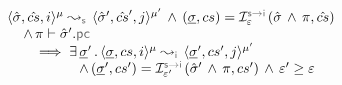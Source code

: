 \begin{lemma}\label{soundiness:control:flow:cmds}
$$
\begin{array}{l} 
\abssemrule{\sstate, \scs, i}{\sstate', \scs', j}{\mode}{\mode'}{\symbolic} 
     \, \wedge \, (\istate, \cs) = \interpret{\symbinst}{\senv}(\sstate \, \wedge \, \pc, \scs) \\ \quad
     \, \wedge \, \pc \vdash \sstate'.\pcsel  \\ \quad \quad
     \implies 
        \exists \, \istate' \, . \, \abssemrule{\istate, \cs, i}{\istate', \cs', j}{\mode}{\mode'}{\instrumented} \\  \quad \quad \quad \quad \quad
         \, \wedge \, 
            (\istate', \cs') = \interpret{\symbinst}{\senv'}(\sstate' \, \wedge \, \pc, \cs')  \, \wedge \, 
            \senv' \fextends  \senv
 \end{array}
$$
\end{lemma}

